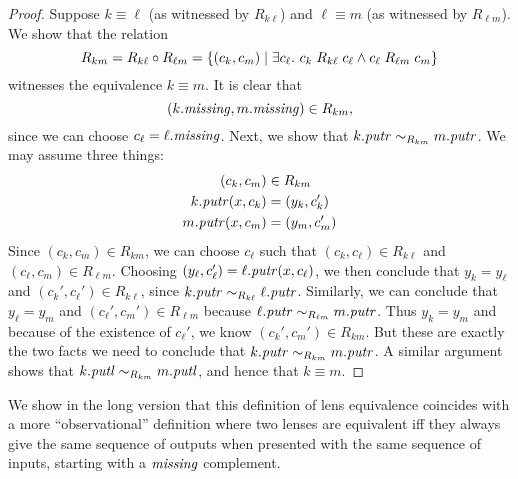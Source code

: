 \begin{defn}[$R$-similarity]
\begin{proof}

Suppose $k \equiv \ell$ (as witnessed by $R_{k\ell}$) and
$\ell \equiv m$ (as witnessed by $R_{\ell m}$). We show that the
relation
\[R_{km} = R_{k\ell}\circ R_{\ell m} = \{(c_k,c_m) \mid \exists c_\ell.\ c_k \mathrel{R_{k\ell}} c_\ell
\land c_\ell \mathrel{R_{\ell m}} c_m\}\]
witnesses the equivalence $k \equiv m$. It is clear that
\[(k.\mathit{missing},m.\mathit{missing}) \in R_{km},\]
since we can choose $c_\ell = \ell.\mathit{missing}$. Next, we show that $k.\mathit{putr}
\sim_{R_{km}} m.\mathit{putr}$. We may assume three things:
\begin{align*}
    (c_k,c_m) &\in R_{km} \\
    k.\mathit{putr}(x,c_k) &= (y_k, c_k') \\
    m.\mathit{putr}(x,c_m) &= (y_m, c_m')
\end{align*}
Since $(c_k,c_m) \in R_{km}$, we can choose $c_\ell$ such that $(c_k,c_\ell)
\in R_{k\ell}$ and $(c_\ell,c_m) \in R_{\ell m}$. Choosing
$(y_\ell,c_\ell')=\ell.\mathit{putr}(x,c_\ell)$, we then conclude that $y_k=y_\ell$
and $(c_k',c_\ell') \in R_{k\ell}$, since $k.\mathit{putr} \sim_{R_{k\ell}}
\ell.\mathit{putr}$. Similarly, we can conclude that $y_\ell=y_m$ and
$(c_\ell',c_m') \in R_{\ell m}$ because $\ell.\mathit{putr} \sim_{R_{\ell m}}
m.\mathit{putr}$. Thus $y_k=y_m$ and because of the
existence of $c_\ell'$, we know $(c_k',c_m') \in R_{km}$. But these are
exactly the two facts we need to conclude that $k.\mathit{putr} \sim_{R_{km}}
m.\mathit{putr}$. A similar argument shows that $k.\mathit{putl} \sim_{R_{km}} m.\mathit{putl}$, and
hence that $k \equiv m$.
\end{proof}
\fi

\iffull\else We show in the long version that this definition of lens
equivalence coincides with a more ``observational'' definition where two
lenses are equivalent iff they always give the same sequence of outputs when
presented with the same sequence of inputs, starting with a $\mathit{missing}$
complement.  

\fi


\end{defn}
